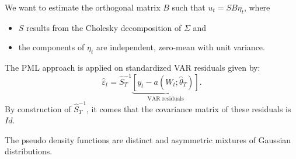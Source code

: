 \documentclass[
  12pt,
]{book}
\newenvironment{Shaded}{\begin{snugshade}}{\end{snugshade}}
\newcommand{\CommentTok}[1]{\textcolor[rgb]{0.56,0.35,0.01}{\textit{#1}}}
\newcommand{\FunctionTok}[1]{\textcolor[rgb]{0.00,0.00,0.00}{#1}}
\newcommand{\NormalTok}[1]{#1}
\newcommand{\OtherTok}[1]{\textcolor[rgb]{0.56,0.35,0.01}{#1}}
\newcommand{\SpecialCharTok}[1]{\textcolor[rgb]{0.00,0.00,0.00}{#1}}
\providecommand{\tightlist}{%
  \setlength{\itemsep}{0pt}\setlength{\parskip}{0pt}}
\theoremstyle{definition}
\theoremstyle{definition}
\theoremstyle{definition}
\theoremstyle{definition}
\theoremstyle{remark}
\begin{document}
\begin{Shaded}
\end{Shaded}

We want to estimate the orthogonal matrix \(B\) such that \(u_t=SB \eta_t\), where

\begin{itemize}
\tightlist
\item
  \(S\) results from the Cholesky decomposition of \(\Sigma\) and
\item
  the components of \(\eta_t\) are independent, zero-mean with unit variance.
\end{itemize}

The PML approach is applied on standardized VAR residuals given by:
\[
\hat\varepsilon_t = \hat{S}_T^{-1}\underbrace{[y_t - a(W_t;\hat\theta_T)]}_{\mbox{VAR residuals}}.
\]
By construction of \(\hat{S}_T^{-1}\), it comes that the covariance matrix of these residuals is \(Id\).

The pseudo density functions are distinct and asymmetric mixtures of Gaussian distributions.
\end{document}
